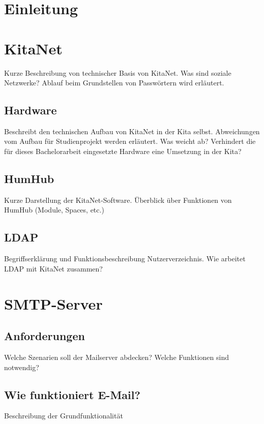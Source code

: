 

\chapter{Einleitung}
\label{sec:Einleitung}

\blindtext


\chapter{KitaNet}

Kurze Beschreibung von technischer Basis von KitaNet. Was sind soziale Netzwerke?
Ablauf beim Grundstellen von Passwörtern wird erläutert.

\section{Hardware}
Beschreibt den technischen Aufbau von KitaNet in der Kita selbst.
Abweichungen vom Aufbau für Studienprojekt werden erläutert. Was weicht ab?
Verhindert die für dieses Bachelorarbeit eingesetzte Hardware eine Umsetzung in der Kita?

\section{HumHub}
Kurze Darstellung der KitaNet-Software. Überblick über Funktionen von HumHub (Module, Spaces, etc.)

\section{LDAP}
Begriffserklärung und Funktionsbeschreibung Nutzerverzeichnis. 
Wie arbeitet LDAP mit KitaNet zusammen?

\chapter{SMTP-Server}

\section{Anforderungen}
Welche Szenarien soll der Mailserver abdecken? Welche Funktionen sind notwendig? 

\section{Wie funktioniert E-Mail?}
Beschreibung der Grundfunktionalität


